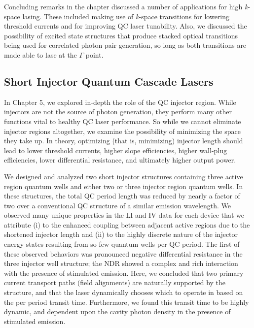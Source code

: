 Concluding remarks in the chapter discussed a number of applications for high \linebreak[3.9] \emph{k}-space lasing.  These included making use of \emph{k}-space transitions for lowering threshold currents and for improving QC laser tunability.  Also, we discussed the possibility of excited state structures that produce stacked optical transitions being used for correlated photon pair generation, so long as both transitions are made able to lase at the $\Gamma$ point.

\subsection{Short Injector Quantum Cascade Lasers}

In Chapter 5, we explored in-depth the role of the QC injector region.  While injectors are not the source of photon generation, they perform many other functions vital to healthy QC laser performance.  So while we cannot eliminate injector regions altogether, we examine the possibility of minimizing the space they take up.  In theory, optimizing (that is, minimizing) injector length should lead to lower threshold currents, higher slope efficiencies, higher wall-plug efficiencies, lower differential resistance, and ultimately higher output power.

We designed and analyzed two short injector structures containing three active region quantum wells and either two or three injector region quantum wells.  In these structures, the total QC period length was reduced by nearly a factor of two over a conventional QC structure of a similar emission wavelength.  We observed many unique properties in the LI and IV data for each device that we attribute (i) to the enhanced coupling between adjacent active regions due to the shortened injector length and (ii) to the highly discrete nature of the injector energy states resulting from so few quantum wells per QC period.  The first of these observed behaviors was pronounced negative differential resistance in the three injector well structure; the NDR showed a complex and rich interaction with the presence of stimulated emission.  Here, we concluded that two primary current transport paths (field alignments) are naturally supported by the structure, and that the laser dynamically chooses which to operate in based on the per period transit time.  Furthermore, we found this transit time to be highly dynamic, and dependent upon the cavity photon density in the presence of stimulated emission.

